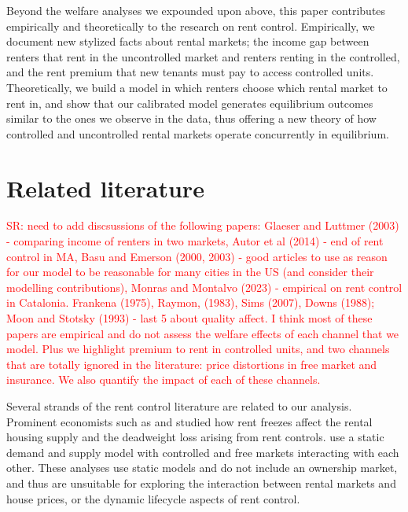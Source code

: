 \documentclass[parskip=full]{article}
\begin{document}
Beyond the welfare analyses we expounded upon above, this paper contributes empirically and theoretically to the research on rent control. Empirically, we document new stylized facts about rental markets; the income gap between renters that rent in the uncontrolled market and renters renting in the controlled, and the rent premium that new tenants must pay to access controlled units. Theoretically, we build a model in which renters choose which rental market to rent in, and show that our calibrated model generates equilibrium outcomes similar to the ones we observe in the data, thus offering a new theory of how controlled and uncontrolled rental markets operate concurrently in equilibrium.


\section{Related literature}\label{sec:related_lit}

\textcolor{red}{SR: need to add discsussions of the following papers: Glaeser and Luttmer (2003) - comparing income of renters in two markets, Autor et al (2014) - end of rent control in MA, Basu and Emerson (2000, 2003) - good articles to use as reason for our model to be reasonable for many cities in the US (and consider their modelling contributions), Monras and Montalvo (2023) - empirical on rent control in Catalonia. Frankena (1975), Raymon, (1983), Sims (2007), Downs (1988); Moon and Stotsky (1993) - last 5 about quality affect. I think most of these papers are empirical and do not assess the welfare effects of each channel that we model. Plus we highlight premium to rent in controlled units, and two channels that are totally ignored in the literature: price distortions in free market and insurance. We also quantify the impact of each of these channels.}

Several strands of the rent control literature are related to our analysis. Prominent economists such as \citet{hayek-1929} and \citet{fs-1946} studied how rent freezes affect the rental housing supply and the deadweight loss arising from rent controls. \citet{fallis-1985} use a static demand and supply model with controlled and free markets interacting with each other. These analyses use static models and do not include an ownership market, and thus are unsuitable for exploring the interaction between rental markets and house prices, or the dynamic lifecycle aspects of rent control.
\end{document}
